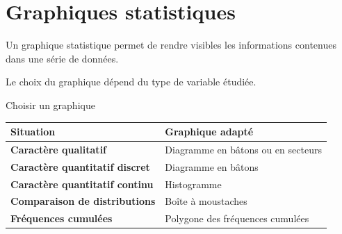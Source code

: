 \section{Graphiques statistiques}

\begin{cadretheorie}
Un graphique statistique permet de rendre visibles les informations contenues dans une série de données.

Le choix du graphique dépend du type de variable étudiée.
\end{cadretheorie}

\begin{cadregris}{Choisir un graphique}
\begin{tabularx}{\textwidth}{>{\bfseries}p{4cm}X}
\toprule
Situation & Graphique adapté \\
\midrule
Caractère qualitatif & Diagramme en bâtons ou en secteurs \\
Caractère quantitatif discret & Diagramme en bâtons \\
Caractère quantitatif continu & Histogramme \\
Comparaison de distributions & Boîte à moustaches \\
Fréquences cumulées & Polygone des fréquences cumulées \\
\bottomrule
\end{tabularx}
\end{cadregris}
